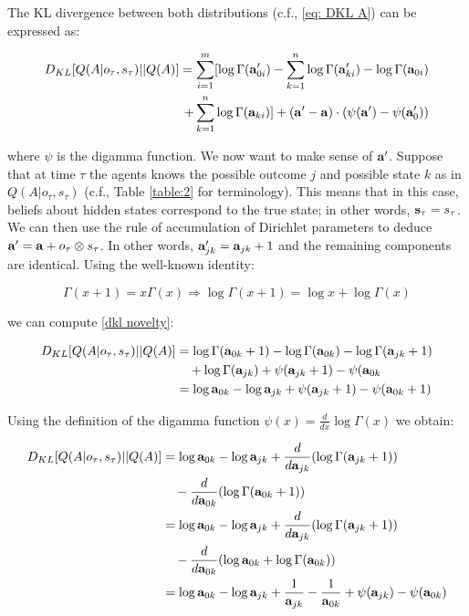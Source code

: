 \documentclass[review,12pt,authoryear]{elsarticle}
\begin{document}
The KL divergence between both distributions (c.f., \eqref{eq: DKL A}) can be expressed as:
	
	\begin{equation}
	\label{dkl novelty}
	\begin{split}
	   	D_{KL}[Q(A|o_\tau, s_\tau) || Q(A)] =\sum_{i=1}^m[\log \Gamma(\bold a '_{0 i}) -\sum_{k=1}^n\log \Gamma(\bold a '_{k i})-\log \Gamma(\bold a _{0 i})\\
		+\sum_{k=1}^n\log \Gamma(\bold a_{k i})]+(\bold a ' - \bold a)\cdot (\psi(\bold a ')-\psi(\bold a '_0)) 
	\end{split}
	\end{equation} 


where $\psi$ is the digamma function. We now want to make sense of $\bold a'$. Suppose that at time $\tau$ the agents knows the possible outcome $j$ and possible state $k$ as in $Q(A|o_\tau,s_\tau)$ (c.f., Table \ref{table:2} for terminology). This means that in this case, beliefs about hidden states correspond to the true state; in other words, $\bold s_\tau =s_\tau$. We can then use the rule of accumulation of Dirichlet parameters to deduce $\bold a'=\bold a +o_\tau \otimes s_\tau $. In other words, $\bold a'_{jk} = \bold a_{jk}+1$ and the remaining components are identical. Using the well-known identity:

\begin{equation}
	\Gamma(x+1)= x\Gamma(x)\Rightarrow \log \Gamma(x+1) = \log x + \log \Gamma(x)
\end{equation}

we can compute \eqref{dkl novelty}:

\begin{equation}
\begin{split}
	D_{KL}[Q(A|o_\tau, s_\tau) || Q(A)] &= \log \Gamma(\bold a_{0k}+1) -\log \Gamma(\bold a_{0k})-\log \Gamma (\bold a_{jk}+1)\\
	&\quad + \log \Gamma (\bold a_{jk})+\psi(\bold a_{jk}+1)-\psi(\bold a_{0k} \\
	&=\log \bold a_{0k}-\log \bold a_{jk}+\psi (\bold a_{jk}+1)-\psi (\bold a_{0k}+1)
\end{split}
\end{equation}

Using the definition of the digamma function $\psi(x)=\frac{d}{dx} \log \Gamma(x)$ we obtain:

\begin{equation}
	\begin{split}
	D_{KL}[Q(A|o_\tau, s_\tau) || Q(A)] &= \log \bold a_{0k}-\log \bold a_{jk} +\frac{d}{d \bold a_{jk}}(\log \Gamma(\bold a_{jk}+1))\\
	&\quad - \frac{d}{d \bold a_{0k}}(\log \Gamma(\bold a _{0k}+1))\\
	&= \log \bold a_{0k}-\log \bold a_{jk} +\frac{d}{d \bold a_{jk}}(\log \Gamma(\bold a_{jk}+1))\\
	&\quad - \frac{d}{d \bold a_{0k}}(\log \bold a _{0k} +\log \Gamma(\bold a _{0k})) \\
	&= \log \bold a_{0k}-\log \bold a_{jk} + \frac{1}{\bold a_{jk}}-\frac{1}{\bold a_{0k}} +\psi(\bold a_{jk})-\psi(\bold a_{0k})
	\end{split}
\end{equation}
\end{document}
